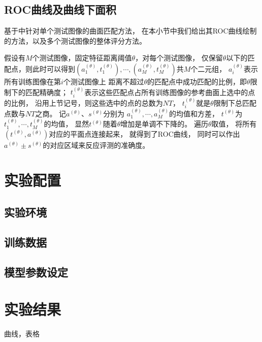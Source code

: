 \subsection{ROC曲线及曲线下面积}
基于中针对单个测试图像的曲面匹配方法，
在本小节中我们给出其ROC曲线绘制的方法，以及多个测试图像的整体评分方法。

假设有$M$个测试图像，固定特征距离阈值$\theta$，对每个测试图像，
仅保留$\theta$以下的匹配点，则此时可以得到$(a_1^{(\theta)},
t_1^{(\theta)}),\cdots,(a_M^{(\theta)}, t_M^{(\theta)})$共$M$个二元组，
$a_i^{(\theta)}$表示所有训练图像在第$i$个测试图像上
距离不超过$\theta$的匹配点中成功匹配的比例，即$\theta$限制下的匹配精确度；
$t_i^{(\theta)}$表示这些匹配点占所有训练图像的参考曲面上选中的点的比例，
沿用上节记号，则这些选中的点的总数为$NT$，
$t_i^{(\theta)}$就是$\theta$限制下总匹配点数与$NT$之商。
记$a^{(\theta)}$、$s^{(\theta)}$分别为
$a_1^{(\theta)},\cdots,a_M^{(\theta)}$的均值和方差，
$t^{(\theta)}$为$t_1^{(\theta)},\cdots,t_M^{(\theta)}$的均值，
显然$t^{(\theta)}$随着$\theta$增加是单调不下降的。
遍历$\theta$取值，
将所有$(t^{(\theta)}, a^{(\theta)})$对应的平面点连接起来，
就得到了ROC曲线，
同时可以作出$a^{(\theta)} \pm s^{(\theta)}$的对应区域来反应评测的准确度。


\section{实验配置}

\subsection{实验环境}

\subsection{训练数据}

\subsection{模型参数设定}


\section{实验结果}
曲线，表格




